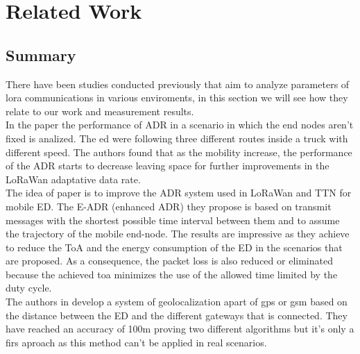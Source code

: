 
\chapter{Related Work}
\label{chap:second}
\ifpdf
    \graphicspath{{Chapter2/Figures/PNG/}{Chapter2/Figures/PDF/}{Chapter2/Figures/}}
\else
    \graphicspath{{Chapter2/Figures/EPS/}{Chapter2/Figures/}}
\fi

\section*{Summary}


There have been studies conducted previously that aim to analyze parameters of lora communications in various enviroments, 
in this section we will see how they relate to our work and measurement results.\\

In the paper \cite{kousias2019empirical} the performance of ADR in a scenario in which the end nodes aren’t fixed is analized. 
The \acrfull{ed} were following three different routes inside a truck with different speed. The authors found 
that as the mobility increase, the performance of the ADR starts to decrease leaving space for 
further improvements in the LoRaWan adaptative data rate.\\

The idea of paper \cite{benkahla2019enhanced} is to improve the ADR system used in LoRaWan and TTN for mobile ED. The E-ADR (enhanced ADR) 
they propose is based on transmit messages with the shortest possible time interval between them and to assume the 
trajectory of the mobile end-node. The results are impressive as they achieve to reduce the ToA and the energy 
consumption of the ED in the scenarios that are proposed. As a consequence, the packet loss is also reduced or 
eliminated because the achieved \acrfull{toa} minimizes the use of the allowed time limited by the duty cycle.\\

The authors in \cite{fargas2017gps} develop a system of geolocalization apart of gps or gsm based on the distance between the ED 
and the different gateways that is connected. They have reached an accuracy of 100m proving two different algorithms but it's only a firs 
aproach as this method can't be applied in real scenarios.\\


